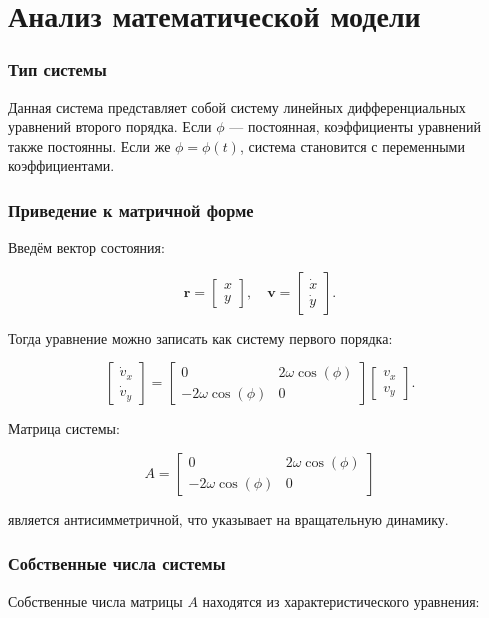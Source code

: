 \chapter{Анализ математической модели}
\subsection*{Тип системы}
Данная система представляет собой систему линейных дифференциальных уравнений второго порядка. Если $\phi$ — постоянная, коэффициенты уравнений также постоянны. Если же $\phi = \phi(t)$, система становится с переменными коэффициентами.

\subsection*{Приведение к матричной форме}
Введём вектор состояния:

\[
\mathbf{r} = \begin{bmatrix} x \\ y \end{bmatrix}, \quad
\mathbf{v} = \begin{bmatrix} \dot{x} \\ \dot{y} \end{bmatrix}.
\]

Тогда уравнение можно записать как систему первого порядка:

\[
\begin{bmatrix} \dot{v}_x \\ \dot{v}_y \end{bmatrix}
=
\begin{bmatrix} 0 & 2\omega \cos(\phi) \\ -2\omega \cos(\phi) & 0 \end{bmatrix}
\begin{bmatrix} v_x \\ v_y \end{bmatrix}.
\]

Матрица системы:

\[
A = \begin{bmatrix} 0 & 2\omega \cos(\phi) \\ -2\omega \cos(\phi) & 0 \end{bmatrix}
\]

является антисимметричной, что указывает на вращательную динамику.

\subsection*{Собственные числа системы}
Собственные числа матрицы $A$ находятся из характеристического уравнения:

